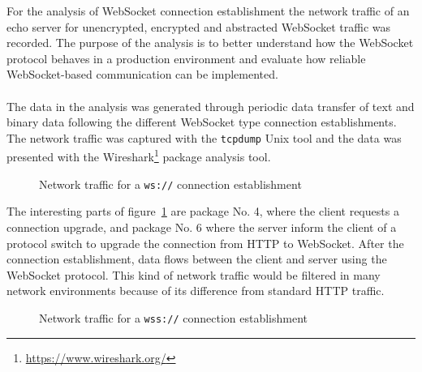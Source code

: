 For the analysis of WebSocket connection establishment the network traffic of an echo server for unencrypted, encrypted and abstracted WebSocket traffic was recorded. The purpose of the analysis is to better understand how the WebSocket protocol behaves in a production environment and evaluate how reliable WebSocket-based communication can be implemented.
\\ \\
The data in the analysis was generated through periodic data transfer of text and binary data following the different WebSocket type connection establishments. The network traffic was captured with the \texttt{tcpdump} Unix tool and the data was presented with the Wireshark\footnote{\url{https://www.wireshark.org/}} package analysis tool.
\\
\begin{figure}[h!]
	\centering
	\caption{Network traffic for a \texttt{ws://} connection establishment}
	\label{fig:wsTraffic}
\end{figure}

\noindent
The interesting parts of figure~\ref{fig:wsTraffic} are package No. 4, where the client requests a connection upgrade, and package No. 6 where the server inform the client of a protocol switch to upgrade the connection from HTTP to WebSocket. After the connection establishment, data flows between the client and server using the WebSocket protocol. This kind of network traffic would be filtered in many network environments because of its difference from standard HTTP traffic.
\\
\begin{figure}[h!]
	\centering
	\caption{Network traffic for a \texttt{wss://} connection establishment}
	\label{fig:wssTraffic}
\end{figure}

